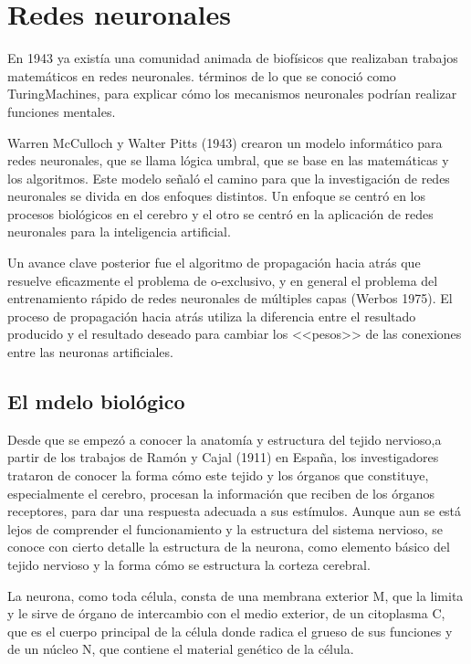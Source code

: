 \section{Redes neuronales}

En 1943 ya exist\'ia una comunidad animada de biof\'isicos que realizaban trabajos matem\'aticos en redes neuronales. t\'erminos de lo que se conoci\'o como TuringMachines, para explicar c\'omo los mecanismos neuronales podr\'ian realizar funciones mentales.

Warren McCulloch y Walter Pitts (1943) crearon un modelo inform\'atico para redes neuronales, que se llama l\'ogica umbral, que se base en las matem\'aticas y los algoritmos. Este modelo se\~nal\'o el camino para que la investigaci\'on de redes neuronales se divida en dos enfoques distintos. Un enfoque se centr\'o en los procesos biol\'ogicos en el cerebro y el otro se centr\'o en la aplicaci\'on de redes neuronales para la inteligencia artificial.

Un avance clave posterior fue el algoritmo de propagaci\'on hacia atr\'as que resuelve eficazmente el problema de o-exclusivo, y en general el problema del entrenamiento r\'apido de redes neuronales de m\'ultiples capas (Werbos 1975). El proceso de propagaci\'on hacia atr\'as utiliza la diferencia entre el resultado producido y el resultado deseado para cambiar los <<pesos>> de las conexiones entre las neuronas artificiales.

\subsection{El mdelo biol\'ogico}
Desde que se empez\'o a conocer la anatom\'ia y estructura
del tejido nervioso,a partir de los trabajos de Ram\'on y
Cajal (1911) en Espa\~na, los investigadores trataron de
conocer la forma c\'omo este tejido y los \'organos que
constituye, especialmente el cerebro, procesan la
informaci\'on que reciben de los \'organos receptores, para dar
una respuesta adecuada a sus est\'imulos. Aunque aun se est\'a
lejos de comprender el funcionamiento y la estructura del
sistema nervioso, se conoce con cierto detalle la estructura
de la neurona, como elemento b\'asico del tejido nervioso y la
forma c\'omo se estructura la corteza cerebral.

La neurona, como toda c\'elula, consta de una membrana
exterior M, que la limita y le sirve de \'organo de
intercambio con el medio exterior, de un citoplasma C, que
es el cuerpo principal de la c\'elula donde radica el grueso
de sus funciones y de un n\'ucleo N, que contiene el material
gen\'etico de la c\'elula. 

